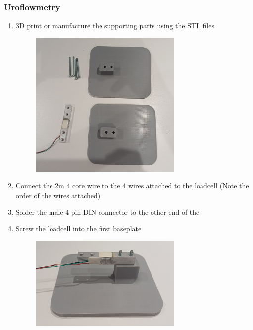 \subsubsection{Uroflowmetry}


\begin{enumerate}
    \item 3D print or manufacture the supporting parts using the STL files
    \begin{figure}[h]
        \centering
        \includegraphics[width=0.7\textwidth]{Figures/Manufacture/Uroflowmetry/uf_required_parts.jpg}
        \label{fig:ufrequiredparts}
      \end{figure}
    \item Connect the 2m 4 core wire to the 4 wires attached to the loadcell (Note the order of the wires attached)
    \item Solder the male 4 pin DIN connector to the other end of the 
    \item Screw the loadcell into the first baseplate
    \begin{figure}[h]
        \centering
        \includegraphics[width=0.7\textwidth]{Figures/Manufacture/Uroflowmetry/uf_screw_first_baseplate.jpg}

\end{figure}
\end{enumerate}
